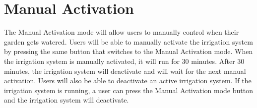 \section{Manual Activation}
\label{loc:Manual}
The Manual Activation mode will allow users to manually control when their garden gets watered. Users will be able to manually activate the \ThisSys irrigation system by pressing the same button that switches \ThisSys 
to the Manual Activation mode. When the \ThisSys irrigation system is manually activated, it will run for 30 minutes. After 30 minutes, the \ThisSys irrigation system will deactivate and \ThisSys will wait for the next manual activation.
Users will also be able to deactivate an active irrigation system. If the \ThisSys irrigation system is running, a user can press the Manual Activation mode button and the irrigation system will deactivate.